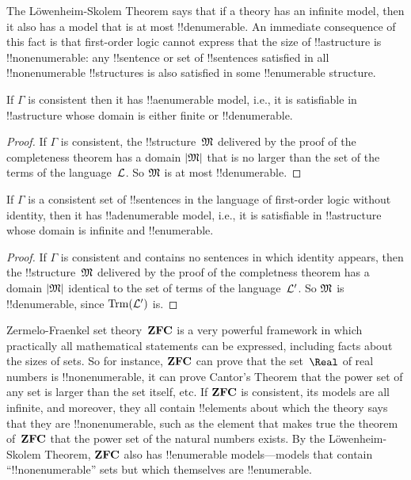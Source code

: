 \documentclass[../../../include/open-logic-section]{subfiles}
\begin{document}

The L\"owenheim-Skolem Theorem says that if a theory has an infinite
model, then it also has a model that is at most !!{denumerable}. An
immediate consequence of this fact is that first-order logic cannot
express that the size of !!a{structure} is !!{nonenumerable}: any
!!{sentence} or set of !!{sentence}s satisfied in all
!!{nonenumerable} !!{structure}s is also satisfied in some
!!{enumerable} structure.

\begin{thm} 
 If $\Gamma$ is consistent then it has
!!a{enumerable} model, i.e., it is satisfiable in !!a{structure}
whose domain is either finite or !!{denumerable}.
\end{thm}

\begin{proof}
If $\Gamma$ is consistent, the !!{structure}~$\Struct M$ delivered by
the proof of the completeness theorem has a domain $\Domain{M}$ that
is no larger than the set of the terms of the language~$\Lang L$. So
$\Struct M$ is at most !!{denumerable}.
\end{proof}

\begin{thm}
 If $\Gamma$ is a consistent set of !!{sentence}s
in the language of first-order logic without identity, then it has
!!a{denumerable} model, i.e., it is satisfiable in !!a{structure}
whose domain is infinite and !!{enumerable}.
\end{thm}

\begin{proof}
If $\Gamma$ is consistent and contains no sentences in which identity
appears, then the !!{structure}~$\Struct M$ delivered by the proof of
the completness theorem has a domain $\Domain{M}$ identical to the set
of terms of the language~$\Lang L'$. So $\Struct{M}$ is
!!{denumerable}, since $\Trm[L']$ is.
\end{proof}

\begin{ex}
Zermelo-Fraenkel set theory~$\Log{ZFC}$ is a very powerful framework
in which practically all mathematical statements can be expressed,
including facts about the sizes of sets. So for instance, $\Log{ZFC}$
can prove that the set~$\Real$ of real numbers is !!{nonenumerable},
it can prove Cantor's Theorem that the power set of any set is larger
than the set itself, etc.  If $\Log{ZFC}$ is consistent, its models
are all infinite, and moreover, they all contain !!{element}s about
which the theory says that they are !!{nonenumerable}, such as the
element that makes true the theorem of~$\Log{ZFC}$ that the power set
of the natural numbers exists. By the L\"owenheim-Skolem Theorem,
$\Log{ZFC}$ also has !!{enumerable} models---models that contain
``!!{nonenumerable}'' sets but which themselves are !!{enumerable}.
\end{ex}
\end{document}
